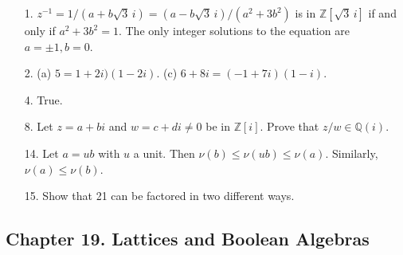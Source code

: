 {\small
\begin{itemize}
 
\item[1.]
$z^{-1} = 1/(a + b\sqrt{3}\, i) = (a -b \sqrt{3}\, i)/(a^2 + 3b^2)$ is in
${\mathbb Z}[\sqrt{3}\, i]$ if and only if $a^2 + 3 b^2 = 1$.  The only
integer solutions to the equation are $a = \pm 1, b = 0$.

 
\item[2.]
(a) $5 = 1 + 2i)(1 -2i)$.
(c) $6 + 8i = (-1+7i)(1-i)$.
 
\item[4.]
True.


\item[8.]
Let $z=a + bi$ and $w=c + di \neq 0$ be in ${\mathbb Z}[i]$. Prove that
$z/w \in {\mathbb Q}(i)$.



 
\item[14.]
Let $a = ub$ with $u$ a unit. Then $\nu(b) \leq \nu(ub) \leq \nu(a)$.
Similarly, $\nu(a) \leq \nu(b)$.
 

\item[15.]
Show that 21 can be factored in two different ways.



\end{itemize}
}



\subsection*{Chapter 19. Lattices and Boolean Algebras}
 
